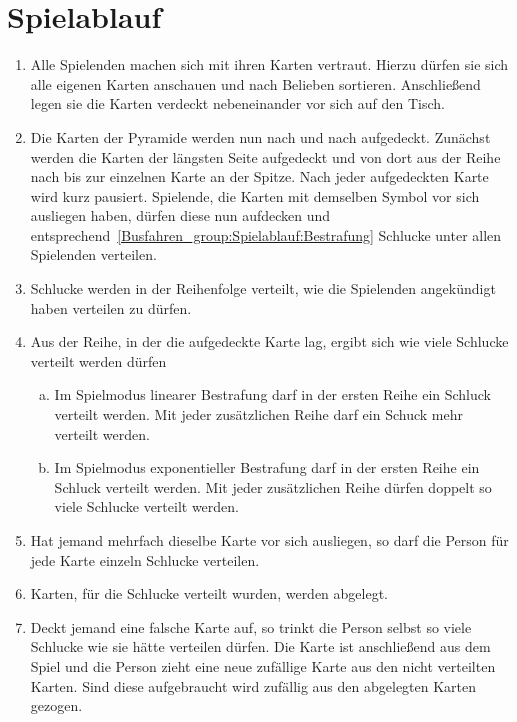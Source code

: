 \section{Spielablauf}\label{Busfahren_group:Spielablauf}
\begin{enumerate}[label={(\arabic*)}]
    \item
    Alle Spielenden machen sich mit ihren Karten vertraut.
    Hierzu dürfen sie sich alle eigenen Karten anschauen und nach Belieben sortieren.
    Anschließend legen sie die Karten verdeckt nebeneinander vor sich auf den Tisch.

    \item
    Die Karten der Pyramide werden nun nach und nach aufgedeckt.
    Zunächst werden die Karten der längsten Seite aufgedeckt und von dort aus der Reihe nach bis zur einzelnen Karte an der Spitze.
    Nach jeder aufgedeckten Karte wird kurz pausiert.
    Spielende, die Karten mit demselben Symbol vor sich ausliegen haben, dürfen diese nun aufdecken und entsprechend~\ref{Busfahren_group:Spielablauf:Bestrafung} Schlucke unter allen Spielenden verteilen.

    \item Schlucke werden in der Reihenfolge verteilt, wie die Spielenden angekündigt haben verteilen zu dürfen.

    \item\label{Busfahren_group:Spielablauf:Bestrafung}
    Aus der Reihe, in der die aufgedeckte Karte lag, ergibt sich wie viele Schlucke verteilt werden dürfen
    \begin{enumerate}[a.]
        \item
        Im Spielmodus linearer Bestrafung darf in der ersten Reihe ein Schluck verteilt werden.
        Mit jeder zusätzlichen Reihe darf ein Schuck mehr verteilt werden.
        \item
        Im Spielmodus exponentieller Bestrafung darf in der ersten Reihe ein Schluck verteilt werden.
        Mit jeder zusätzlichen Reihe dürfen doppelt so viele Schlucke verteilt werden.
    \end{enumerate}

    \item 
    Hat jemand mehrfach dieselbe Karte vor sich ausliegen, so darf die Person für jede Karte einzeln Schlucke verteilen.

    \item
    Karten, für die Schlucke verteilt wurden, werden abgelegt.

    \item\label{Busfahren_group:Spielablauf:Ziehen}
    Deckt jemand eine falsche Karte auf, so trinkt die Person selbst so viele Schlucke wie sie hätte verteilen dürfen.
    Die Karte ist anschließend aus dem Spiel und die Person zieht eine neue zufällige Karte aus den nicht verteilten Karten.
    Sind diese aufgebraucht wird zufällig aus den abgelegten Karten gezogen.


\end{enumerate}

